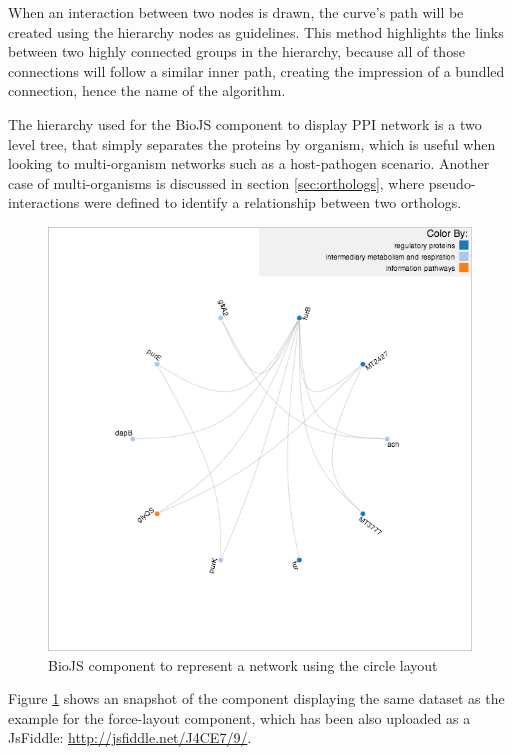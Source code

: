 When an interaction between two nodes is drawn, the curve's path will be created using the hierarchy nodes as guidelines. This method highlights the links between two highly connected groups in the hierarchy, because all of those connections will follow a similar inner path, creating the impression of a bundled connection, hence the name of the algorithm.

The hierarchy used for the BioJS component to display PPI network is a two level tree, that simply separates the proteins by organism, which is useful when looking to multi-organism networks such as a host-pathogen scenario. Another case of multi-organisms is discussed in section \ref{sec:orthologs}, where pseudo-interactions were defined to identify a relationship between two orthologs.

\begin{figure}[ht]
\centering
\includegraphics[width=5in]{figures/circle.png}
\caption[BioJS component to represent a network using the circle layout]{BioJS component to represent a network using the circle layout
\label{fig:biojs_circle}}
\end{figure}

Figure \ref{fig:biojs_circle} shows an snapshot of the component displaying the same dataset as the example for the force-layout component, which has been also uploaded as a JsFiddle: \url{http://jsfiddle.net/J4CE7/9/}.

